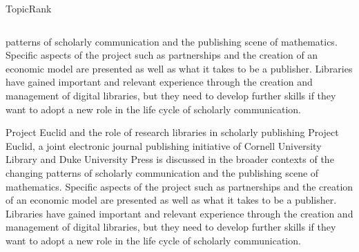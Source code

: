 \begin{frame}{TopicRank}
\begin{columns}
\begin{column}{.55\textwidth}
{{\begin{exampleblock}
              \textcolor{BrickRed}{patterns} of \textcolor{BrickRed}{scholarly
              communication} and the \textcolor{BrickRed}{publishing scene} of
              \textcolor{BrickRed}{mathematics}. \textcolor{BrickRed}{Specific
              aspects} of the \textcolor{BrickRed}{project such} as
              \textcolor{BrickRed}{partnerships} and the
              \textcolor{BrickRed}{creation} of an \textcolor{BrickRed}{economic
              model} are presented as well as what it takes to be a
              \textcolor{BrickRed}{publisher}. \textcolor{BrickRed}{Libraries}
              have gained \textcolor{BrickRed}{important} and
              \textcolor{BrickRed}{relevant experience} through the
              \textcolor{BrickRed}{creation} and
              \textcolor{BrickRed}{management} of \textcolor{BrickRed}{digital
              libraries}, but they need to develop \textcolor{BrickRed}{further
              skills} if they want to adopt a \textcolor{BrickRed}{new role} in
              the \textcolor{BrickRed}{life cycle} of
              \textcolor{BrickRed}{scholarly communication}.
            \end{exampleblock}
          }
        }{ %
          \begin{exampleblock}{\footnotesize Project Euclid and the role of
                               research libraries in scholarly publishing}
            \footnotesize Project Euclid, a joint electronic journal publishing
            initiative of Cornell University Library and Duke University Press
            is discussed in the broader contexts of the changing patterns of
            scholarly communication and the publishing scene of mathematics.
            Specific aspects of the project such as partnerships and the
            creation of an economic model are presented as well as what it takes
            to be a publisher. Libraries have gained important and relevant
            experience through the creation and management of digital libraries,
            but they need to develop further skills if they want to adopt a new
            role in the life cycle of scholarly communication.
          \end{exampleblock}
        }
      \end{column}
    \end{columns}
  \end{frame}

